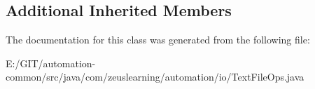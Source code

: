 \subsection*{Additional Inherited Members}


The documentation for this class was generated from the following file\+:\begin{DoxyCompactItemize}
\item 
E\+:/\+G\+I\+T/automation-\/common/src/java/com/zeuslearning/automation/io/Text\+File\+Ops.\+java\end{DoxyCompactItemize}
